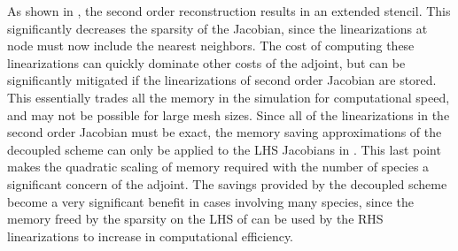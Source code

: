 As shown in , the second order
reconstruction results in an extended stencil.  This significantly decreases the
sparsity of the Jacobian, since the linearizations at node must now include the
nearest neighbors.  The cost of computing these linearizations can quickly
dominate other costs of the adjoint, but can be significantly mitigated if the
linearizations of second order Jacobian are stored.  This essentially trades all
the memory in the simulation for computational speed, and may not be possible
for large mesh sizes.  Since all of the linearizations in the second order
Jacobian must be exact, the memory saving approximations of the decoupled scheme
can only be applied to the LHS Jacobians in .  This last
point makes the quadratic scaling of memory required with the number of species
a significant concern of the adjoint.  The savings provided by the decoupled
scheme become a very significant benefit in cases involving many species, since
the memory freed by the sparsity on the LHS of  can be
used by the RHS linearizations to increase in computational efficiency.
